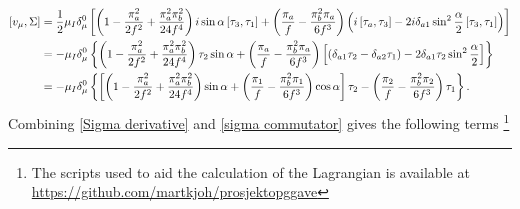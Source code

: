 \begin{align}
    \notag
    \left[v_\mu, \Sigma \right] & = 
    \frac{1}{2} \mu_I \delta^0_\mu
    \left[
        \left(
            1 
            - \frac{\pi_a^2}{2f^2}
            + \frac{\pi_a^2\pi_b^2}{24f^4}
        \right)
        i \sin{\alpha} \left[\tau_3, \tau_1 \right]
        + 
        \left(
            \frac{\pi_a}{f} 
            - \frac{\pi_b^2\pi_a}{6f^3} 
        \right)
        \left(
            i\left[\tau_a, \tau_3 \right] 
            - 2i\delta_{a1}\sin^2{\frac{\alpha}{2}}\left[\tau_3, \tau_1 \right]
        \right)
    \right] \\
    \notag
    & =
    -\mu_I \delta^0_\mu
    \left\{
        \left(
            1 
            - \frac{\pi_a^2}{2f^2}
            + \frac{\pi_a^2\pi_b^2}{24f^4}
        \right)
        \tau_2 \sin{\alpha}
        + 
        \left(
            \frac{\pi_a}{f} 
            - \frac{\pi_b^2\pi_a}{6f^3} 
        \right)
        \left[
            (\delta_{a1} \tau_2 - \delta_{a2} \tau_1)
            - 2\delta_{a1} \tau_2 \sin^2{\frac{\alpha}{2}}
        \right]
    \right\} \\
    & =
    -\mu_I \delta^0_\mu
    \left\{
        \left[
        \left(
            1 
            - \frac{\pi_a^2}{2f^2}
            + \frac{\pi_a^2\pi_b^2}{24f^4}
        \right)
        \sin{\alpha}
        + 
        \left(
            \frac{\pi_1}{f} 
            - \frac{\pi_b^2\pi_1}{6f^3} 
        \right) \cos{\alpha}
        \right]
         \tau_2
        -
        \left(
            \frac{\pi_2}{f} 
            - \frac{\pi_b^2\pi_2}{6f^3} 
        \right)
        \tau_1
    \right\}.
    \label{sigma commutator}
\end{align}
Combining \autoref{Sigma derivative} and \autoref{sigma commutator} gives the following terms \footnote{The scripts used to aid the calculation of the Lagrangian is available at \url{https://github.com/martkjoh/prosjektopggave}}
